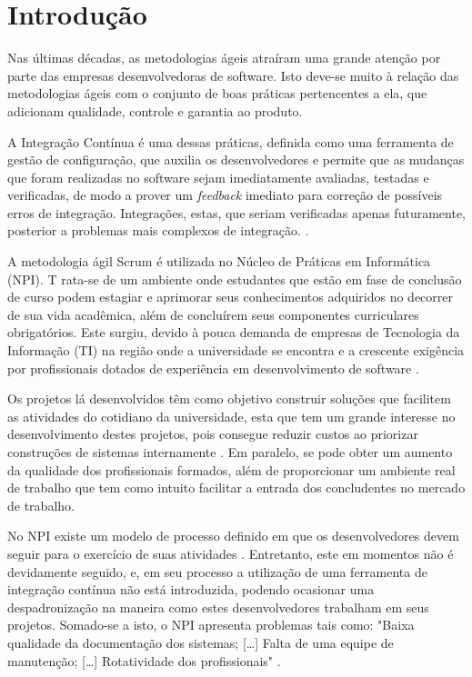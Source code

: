 \chapter{Introdução}
\vspace{-2em}
Nas últimas décadas, as metodologias ágeis atraíram uma grande atenção por parte das empresas desenvolvedoras de software. Isto deve-se muito à relação das metodologias ágeis com o conjunto de boas práticas pertencentes a ela, que adicionam qualidade, controle e garantia ao produto.


A Integração Contínua é uma dessas práticas, definida como uma ferramenta de gestão de configuração, que auxilia os desenvolvedores e permite que as mudanças que foram realizadas no software sejam imediatamente avaliadas, testadas e verificadas, de modo a prover um \textit{feedback} imediato para correção de possíveis erros de integração. Integrações, estas, que seriam verificadas apenas futuramente, posterior a problemas mais complexos de integração. \cite{paul2007}.

A metodologia ágil Scrum é utilizada no Núcleo de Práticas em Informática (NPI). T	rata-se de um ambiente onde estudantes que estão em fase de conclusão de curso podem estagiar e aprimorar seus conhecimentos adquiridos no decorrer de sua vida acadêmica, além de concluírem seus componentes curriculares obrigatórios. Este surgiu, devido à pouca demanda de empresas de Tecnologia da Informação (TI) na região onde a universidade se encontra e a crescente exigência por profissionais dotados de experiência em desenvolvimento de software \cite{npi2013}.

Os projetos lá desenvolvidos têm como objetivo construir soluções que facilitem as atividades do cotidiano da universidade, esta que tem um grande interesse no desenvolvimento destes projetos, pois consegue reduzir custos ao priorizar construções de sistemas internamente \cite{npi2013}. Em paralelo, se pode obter um aumento da qualidade dos profissionais formados, além de proporcionar um ambiente real de trabalho que tem como intuito facilitar a entrada dos concludentes no mercado de trabalho.

No NPI existe um modelo de processo definido em que os desenvolvedores devem seguir para o exercício de suas atividades \cite{npi2013}. Entretanto, este em momentos não é devidamente seguido, e, em seu processo a utilização de uma ferramenta de integração contínua não está introduzida, podendo ocasionar uma despadronização na maneira como estes  desenvolvedores trabalham em seus projetos. Somado-se a isto, o NPI apresenta problemas tais como: "Baixa qualidade da documentação dos sistemas; [\ldots] Falta de uma equipe de manutenção; [\ldots] Rotatividade dos profissionais" \cite[p.~4]{paduelli2006}.

